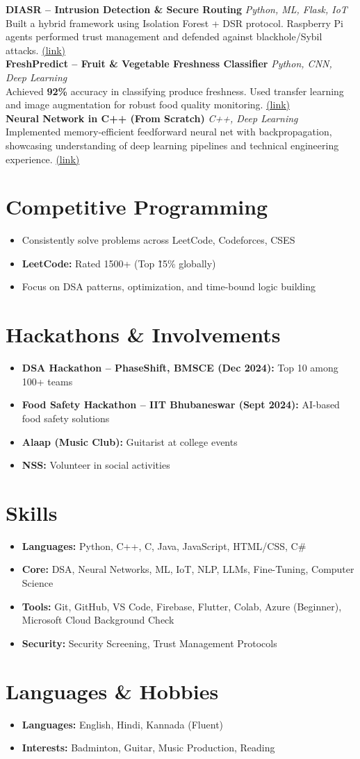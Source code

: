\documentclass[letterpaper,10.5pt]{article}
\newcommand{\resumeItem}[1]{\item\small{#1}}
\newcommand{\resumeItemListStart}{\begin{itemize}[noitemsep,topsep=0pt,parsep=0pt,partopsep=0pt]}
\newcommand{\resumeItemListEnd}{\end{itemize}}
\begin{document}
\noindent
\textbf{DIASR – Intrusion Detection \& Secure Routing} \textit{Python, ML, Flask, IoT} \\
Built a hybrid framework using Isolation Forest + DSR protocol. Raspberry Pi agents performed trust management and defended against blackhole/Sybil attacks. \href{https://github.com/Protham1/DIDS/tree/v1}{(link)} \\[6pt]

\noindent
\textbf{FreshPredict – Fruit \& Vegetable Freshness Classifier} \textit{Python, CNN, Deep Learning} \\
Achieved \textbf{92\%} accuracy in classifying produce freshness. Used transfer learning and image augmentation for robust food quality monitoring. \href{https://github.com/Protham1/FreshPredict}{(link)} \\[6pt]

\noindent
\textbf{Neural Network in C++ (From Scratch)} \textit{C++, Deep Learning} \\
Implemented memory-efficient feedforward neural net with backpropagation, showcasing understanding of deep learning pipelines and technical engineering experience. \href{https://github.com/Protham1/DL}{(link)} \\[6pt]

\section*{Competitive Programming}
\resumeItemListStart
    \resumeItem{Consistently solve problems across LeetCode, Codeforces, CSES}
    \resumeItem{\textbf{LeetCode:} Rated 1500+ (Top \~15\% globally)}
    \resumeItem{Focus on DSA patterns, optimization, and time-bound logic building}
\resumeItemListEnd

\section*{Hackathons \& Involvements}
\resumeItemListStart
  \resumeItem{\textbf{DSA Hackathon – PhaseShift, BMSCE (Dec 2024):} Top 10 among 100+ teams}
  \resumeItem{\textbf{Food Safety Hackathon – IIT Bhubaneswar (Sept 2024):} AI-based food safety solutions}
  \resumeItem{\textbf{Alaap (Music Club):} Guitarist at college events}
  \resumeItem{\textbf{NSS:} Volunteer in social activities}
\resumeItemListEnd

\section{Skills}
\resumeItemListStart
    \resumeItem{\textbf{Languages:} Python, C++, C, Java, JavaScript, HTML/CSS, C\#}
    \resumeItem{\textbf{Core:} DSA, Neural Networks, ML, IoT, NLP, LLMs, Fine-Tuning, Computer Science}
    \resumeItem{\textbf{Tools:} Git, GitHub, VS Code, Firebase, Flutter, Colab, Azure (Beginner), Microsoft Cloud Background Check}
    \resumeItem{\textbf{Security:} Security Screening, Trust Management Protocols}
\resumeItemListEnd

\section{Languages \& Hobbies}
\resumeItemListStart
    \resumeItem{\textbf{Languages:} English, Hindi, Kannada (Fluent)}
    \resumeItem{\textbf{Interests:} Badminton, Guitar, Music Production, Reading}
\resumeItemListEnd
\end{document}
